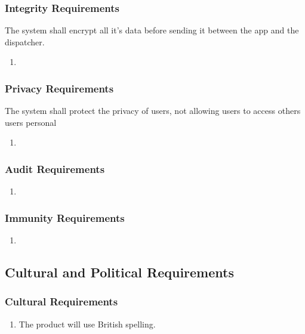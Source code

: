 \documentclass[english]{article}
\begin{document}
\subsubsection{Integrity Requirements}
\label{ssub:integrity_requirements}
The system shall encrypt all it's data before sending it between the app and the dispatcher. 
\begin{enumerate}[{SR}1. ]
	\item 
\end{enumerate}

\subsubsection{Privacy Requirements}
\label{ssub:privacy_requirements}
The system shall protect the privacy of users, not allowing users to access others users personal
\begin{enumerate}[{SR}1. ]
	\item 
\end{enumerate}

\subsubsection{Audit Requirements}
\label{ssub:audit_requirements}
\begin{enumerate}[{SR}1. ]
	\item 
\end{enumerate}

\subsubsection{Immunity Requirements}
\label{ssub:immunity_requirements}
\begin{enumerate}[{SR}1. ]
	\item 
\end{enumerate}


\subsection{Cultural and Political Requirements}
\label{sub:cultural_and_political_requirements}

\subsubsection{Cultural Requirements}
\label{ssub:cultural_requirements}
\begin{enumerate}[{CP}1. ]
	\item The product will use British spelling.
\end{enumerate}
\end{document}
